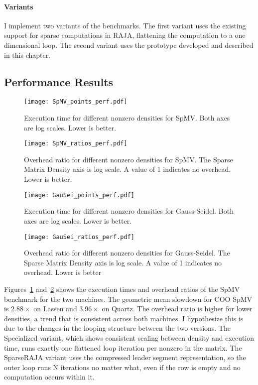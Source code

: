 \paragraph{Variants}
I implement two variants of the benchmarks.
The first variant uses the existing support for sparse computations in RAJA, flattening the computation to a one dimensional loop.
The second variant uses the prototype developed and described in this chapter.

\subsection{Performance Results}

\begin{figure}
  \texttt{[image: SpMV\_points\_perf.pdf]}
  \caption{Execution time for different nonzero densities for SpMV\@. Both axes are log scales. Lower is better.}\label{SpMVTimes}
\end{figure}
\begin{figure}
  \texttt{[image: SpMV\_ratios\_perf.pdf]}
  \caption{Overhead ratio for different nonzero densities for SpMV\@. The Sparse Matrix Density axis is log scale. A value of 1 indicates no overhead. Lower is better.}\label{SpMVRatios}
\end{figure}


\begin{figure}
  \texttt{[image: GauSei\_points\_perf.pdf]}
  \caption{Execution time for different nonzero densities for Gauss-Seidel\@. Both axes are log scales. Lower is better.}\label{GauSeiTimes}
\end{figure}
\begin{figure}
  \texttt{[image: GauSei\_ratios\_perf.pdf]}
  \caption{Overhead ratio for different nonzero densities for Gauss-Seidel. The Sparse Matrix Density axis is log scale. A value of 1 indicates no overhead. Lower is better}\label{GauSeiRatios}
\end{figure}

Figures~\ref{SpMVTimes} and~\ref{SpMVRatios} shows the execution times and overhead ratios of the SpMV benchmark for the two machines.
The geometric mean slowdown for COO SpMV is $2.88\times$ on Lassen and $3.96\times$ on Quartz.
The overhead ratio is higher for lower densities, a trend that is consistent across both machines.
I hypothesize this is due to the changes in the looping structure between the two versions.
The Specialized variant, which shows consistent scaling between density and execution time, runs exactly one flattened loop iteration per nonzero in the matrix.
The SparseRAJA variant uses the compressed leader segment representation, so the outer loop runs N iterations no matter what, even if the row is empty and no computation occurs within it.

